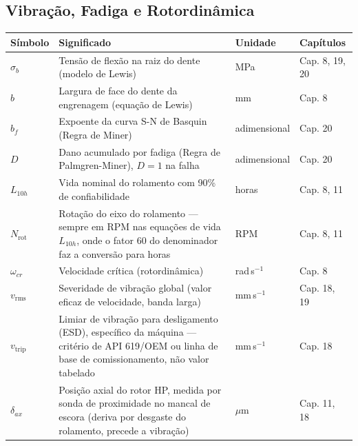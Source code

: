 \documentclass[12pt,a4paper]{article}
\numberwithin{equation}{section}
\numberwithin{table}{section}
\numberwithin{figure}{section}
\begin{document}
{\subsection*{Vibração, Fadiga e Rotordinâmica}
\begin{longtable}{>{\raggedright\arraybackslash}p{2.8cm} >{\raggedright\arraybackslash}p{5.3cm} >{\raggedright\arraybackslash}p{2.1cm} >{\raggedright\arraybackslash}p{4.2cm}}
	\toprule
	\textbf{Símbolo} & \textbf{Significado} & \textbf{Unidade} & \textbf{Capítulos} \\ \midrule
	\endhead
	$\sigma_b$ & Tensão de flexão na raiz do dente (modelo de Lewis) & MPa & Cap. 8, 19, 20 \\
	$b$ & Largura de face do dente da engrenagem (equação de Lewis) & mm & Cap. 8 \\
	$b_f$\dag & Expoente da curva S-N de Basquin (Regra de Miner) & adimensional & Cap. 20 \\
	$D$ & Dano acumulado por fadiga (Regra de Palmgren-Miner), $D=1$ na falha & adimensional & Cap. 20 \\
	$L_{10h}$ & Vida nominal do rolamento com 90\% de confiabilidade & horas & Cap. 8, 11 \\
	$N_{\text{rot}}$\dag & Rotação do eixo do rolamento — sempre em RPM nas equações de vida $L_{10h}$, onde o fator 60 do denominador faz a conversão para horas & RPM & Cap. 8, 11 \\
	$\omega_{cr}$ & Velocidade crítica (rotordinâmica) & rad\,s$^{-1}$ & Cap. 8 \\
	$v_{\text{rms}}$ & Severidade de vibração global (valor eficaz de velocidade, banda larga) & mm\,s$^{-1}$ & Cap. 18, 19 \\
	$v_{\text{trip}}$ & Limiar de vibração para desligamento (ESD), específico da máquina — critério de API 619/OEM ou linha de base de comissionamento, não valor tabelado & mm\,s$^{-1}$ & Cap. 18 \\
	$\delta_{ax}$ & Posição axial do rotor HP, medida por sonda de proximidade no mancal de escora (deriva por desgaste do rolamento, precede a vibração) & $\mu$m & Cap. 11, 18 \\ \bottomrule
\end{longtable}

}
\end{document}
